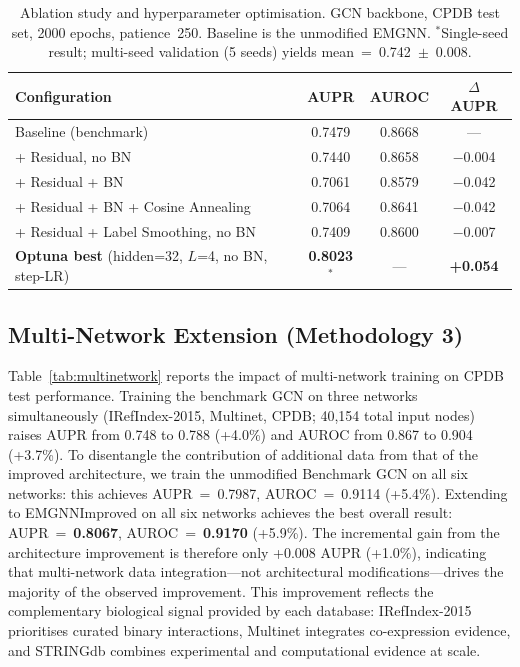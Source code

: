 \begin{table}[ht]
  \centering
  \caption{Ablation study and hyperparameter optimisation. GCN backbone, CPDB test set,
           2000 epochs, patience~250. Baseline is the unmodified EMGNN.
           $^*$Single-seed result; multi-seed validation (5 seeds) yields mean~=~0.742~$\pm$~0.008.}
  \label{tab:ablation}
  \small
  \begin{tabular}{lccc}
    \toprule
    \textbf{Configuration} & \textbf{AUPR} & \textbf{AUROC} & \textbf{$\Delta$ AUPR} \\
    \midrule
    Baseline (benchmark)                      & 0.7479 & 0.8668 & ---      \\
    + Residual, no BN                         & 0.7440 & 0.8658 & $-$0.004 \\
    + Residual + BN                           & 0.7061 & 0.8579 & $-$0.042 \\
    + Residual + BN + Cosine Annealing        & 0.7064 & 0.8641 & $-$0.042 \\
    + Residual + Label Smoothing, no BN       & 0.7409 & 0.8600 & $-$0.007 \\
    \midrule
    \textbf{Optuna best} (hidden=32, $L$=4, no BN, step-LR) & \textbf{0.8023}$^*$ & --- & \textbf{+0.054} \\
    \bottomrule
  \end{tabular}
\end{table}

\subsection{Multi-Network Extension (Methodology 3)}

Table~\ref{tab:multinetwork} reports the impact of multi-network training on CPDB test
performance. Training the benchmark GCN on three networks simultaneously (IRefIndex-2015,
Multinet, CPDB; 40,154 total input nodes) raises AUPR from 0.748 to 0.788 (+4.0\%) and
AUROC from 0.867 to 0.904 (+3.7\%). To disentangle the contribution of additional data
from that of the improved architecture, we train the unmodified Benchmark GCN on all
six networks: this achieves AUPR~=~0.7987, AUROC~=~0.9114 (+5.4\%). Extending to
EMGNNImproved on all six networks achieves the best overall result:
AUPR~=~\textbf{0.8067}, AUROC~=~\textbf{0.9170} (+5.9\%). The incremental gain from
the architecture improvement is therefore only +0.008 AUPR (+1.0\%), indicating that
multi-network data integration---not architectural modifications---drives the majority
of the observed improvement. This improvement reflects the complementary biological
signal provided by each database: IRefIndex-2015 prioritises curated binary interactions,
Multinet integrates co-expression evidence, and STRINGdb combines experimental and
computational evidence at scale.

